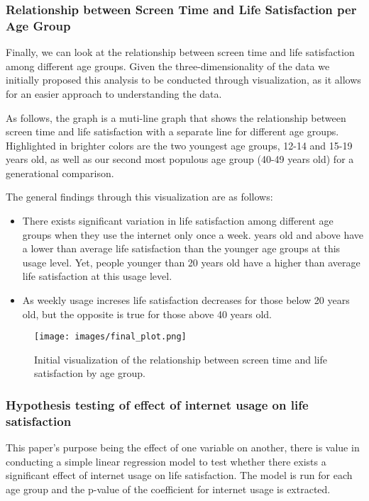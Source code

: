 \documentclass[12pt, a4paper]{article}
\begin{document}
\subsubsection*{Relationship between Screen Time and Life Satisfaction per Age Group}

\par Finally, we can look at the relationship between screen time and life satisfaction among different age groups.
Given the three-dimensionality of the data we initially proposed this analysis to be conducted through visualization, as it allows for an easier approach to understanding the data.
\par As follows, the graph is a muti-line graph that shows the relationship between screen time and life satisfaction with a separate line for different age groups.
Highlighted in brighter colors are the two youngest age groups, 12-14 and 15-19 years old, as well as our second most populous age group (40-49 years old) for a generational comparison.
\par The general findings through this visualization are as follows:
\begin{itemize}
    \item There exists significant variation in life satisfaction among different age groups when they use the internet only once a week.
           years old and above have a lower than average life satisfaction than the younger age groups at this usage level.
          \subitem Yet, people younger than 20 years old have a higher than average life satisfaction at this usage level.
    \item As weekly usage increses life satisfaction decreases for those below 20 years old, but the opposite is true for those above 40 years old.
\end{itemize}
\begin{figure}[!h]
    \centering
    \texttt{[image: images/final\_plot.png]}
    \caption{Initial visualization of the relationship between screen time and life satisfaction by age group.}
\end{figure}

\subsubsection*{Hypothesis testing of effect of internet usage on life satisfaction}

This paper's purpose being the effect of one variable on another, there is value in conducting a simple linear regression model to test whether there exists a significant effect of internet usage on life satisfaction.
The model is run for each age group and the p-value of the coefficient for internet usage is extracted.
\end{document}
